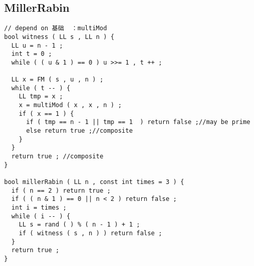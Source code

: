\subsection{MillerRabin}
\begin{lstlisting}[language={}]
// depend on 基础  ：multiMod 
bool witness ( LL s , LL n ) {  
  LL u = n - 1 ;  
  int t = 0 ;  
  while ( ( u & 1 ) == 0 ) u >>= 1 , t ++ ;  
    
  LL x = FM ( s , u , n ) ;  
  while ( t -- ) {  
    LL tmp = x ;  
    x = multiMod ( x , x , n ) ;  
    if ( x == 1 ) {  
      if ( tmp == n - 1 || tmp == 1  ) return false ;//may be prime  
      else return true ;//composite  
    }  
  }  
  return true ; //composite  
}  
  
bool millerRabin ( LL n , const int times = 3 ) {  
  if ( n == 2 ) return true ;  
  if ( ( n & 1 ) == 0 || n < 2 ) return false ;  
  int i = times ;  
  while ( i -- ) {  
    LL s = rand ( ) % ( n - 1 ) + 1 ;  
    if ( witness ( s , n ) ) return false ;  
  }  
  return true ;  
}
\end{lstlisting}
